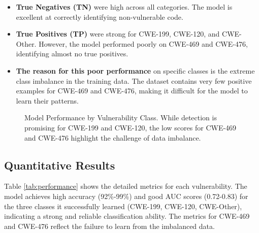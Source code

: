 \documentclass[conference]{IEEEtran}
\begin{document}
\begin{itemize}
    \item \textbf{True Negatives (TN)} were high across all categories. The model is excellent at correctly identifying non-vulnerable code.
    \item \textbf{True Positives (TP)} were strong for CWE-199, CWE-120, and CWE-Other. However, the model performed poorly on CWE-469 and CWE-476, identifying almost no true positives.
    \item \textbf{The reason for this poor performance} on specific classes is the extreme class imbalance in the training data. The dataset contains very few positive examples for CWE-469 and CWE-476, making it difficult for the model to learn their patterns.
\end{itemize}

\begin{figure}[htbp]
\centering
{}
\caption{Model Performance by Vulnerability Class. While detection is promising for CWE-199 and CWE-120, the low scores for CWE-469 and CWE-476 highlight the challenge of data imbalance.}
\label{fig:performance_chart}
\end{figure}

\subsection{Quantitative Results}
Table \ref{tab:performance} shows the detailed metrics for each vulnerability. The model achieves high accuracy (92\%-99\%) and good AUC scores (0.72-0.83) for the three classes it successfully learned (CWE-199, CWE-120, CWE-Other), indicating a strong and reliable classification ability. The metrics for CWE-469 and CWE-476 reflect the failure to learn from the imbalanced data.
\end{document}
